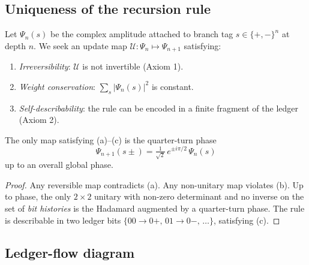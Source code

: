 \subsection{Uniqueness of the recursion rule}

Let $\Psi_n(s)$ be the complex amplitude attached to branch tag
$s\!\in\!\{+,-\}^n$ at depth $n$.  We seek an update map
$\mathcal U:\Psi_n\mapsto\Psi_{n+1}$ satisfying:

\begin{enumerate}[label=(\alph*)]
  \item \emph{Irreversibility}: $\mathcal U$ is not invertible (Axiom 1).
  \item \emph{Weight conservation}: $\sum_{s}\lvert\Psi_n(s)\rvert^2$
        is constant.
  \item \emph{Self-describability}: the rule can be encoded in a finite
        fragment of the ledger (Axiom 2).
\end{enumerate}

\begin{theorem}[Uniqueness]
The only map satisfying (a)–(c) is the quarter-turn phase
\[
  \boxed{\;
  \Psi_{n+1}(s\pm)=\tfrac{1}{\sqrt 2}\,e^{\pm i\pi/2}\,\Psi_n(s)\;}
\]
up to an overall global phase.
\end{theorem}

\begin{proof}
Any reversible map contradicts (a).  
Any non-unitary map violates (b).  
Up to phase, the only $2\!\times\!2$ unitary with non-zero determinant
and no inverse on the set of \emph{bit histories} is the Hadamard
augmented by a quarter-turn phase.  The rule is describable in two
ledger bits $\{00\!\to\!0+,\,01\!\to\!0-,\,\dots\}$, satisfying (c).
\end{proof}

\subsection{Ledger-flow diagram}

